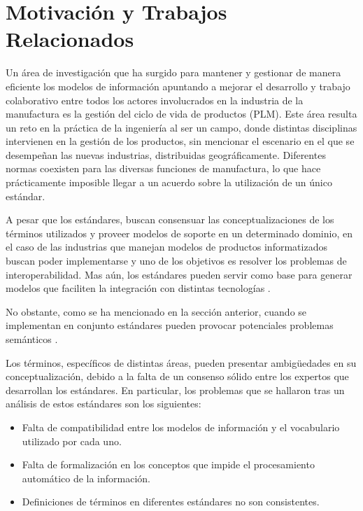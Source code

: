 \documentclass[journal]{IEEEtran}
\begin{document}
\section{Motivaci\'on y Trabajos Relacionados}

Un \'area de investigaci\'on que ha surgido para mantener y gestionar de manera eficiente los modelos de informaci\'on apuntando a mejorar el desarrollo y trabajo colaborativo entre todos los actores involucrados en la industria de la manufactura \cite{Terzi2010} es la gesti\'on del ciclo de vida de productos (PLM). Este \'area resulta un reto en la pr\'actica de la ingenier\'ia al ser un campo, donde distintas disciplinas intervienen en la gesti\'on de los productos, sin mencionar el escenario en el que se desempe\~nan las nuevas industrias, distribuidas geogr\'aficamente. Diferentes normas coexisten para las diversas funciones de manufactura, lo que hace pr\'acticamente imposible llegar a un acuerdo sobre la utilizaci\'on de un \'unico est\'andar. 

A pesar que los est\'andares, buscan consensuar las conceptualizaciones de los t\'erminos utilizados y proveer modelos de soporte en un determinado dominio, en el caso de las industrias que manejan modelos de productos informatizados buscan poder implementarse y uno de los objetivos es resolver los problemas de interoperabilidad. Mas a\'un, los est\'andares pueden servir como base para generar modelos que faciliten la integraci\'on con distintas tecnolog\'ias \cite{Irisarri2016AIndustry}.

No obstante, como se ha mencionado en la secci\'on anterior, cuando se implementan en conjunto est\'andares pueden provocar potenciales problemas sem\'anticos \cite{Young2007}. 

Los t\'erminos, espec\'ificos de distintas \'areas, pueden presentar ambig\"uedades en su conceptualizaci\'on, debido a la falta de un consenso s\'olido entre los expertos que desarrollan los est\'andares. En particular, los problemas que se hallaron tras un an\'alisis de estos est\'andares son los siguientes:

\begin{itemize}
    \item Falta de compatibilidad entre los modelos de informaci\'on y el vocabulario utilizado por cada uno.
    \item Falta de formalizaci\'on en los conceptos que impide el procesamiento autom\'atico de la informaci\'on. 
    \item Definiciones de t\'erminos en diferentes est\'andares no son consistentes. 
\end{itemize}
\end{document}
